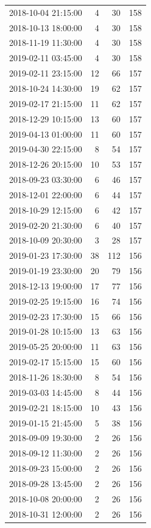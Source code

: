 \begin{tabular}{lrrr}
2018-10-04 21:15:00 & 4 & 30 & 158 \\
2018-10-13 18:00:00 & 4 & 30 & 158 \\
2018-11-19 11:30:00 & 4 & 30 & 158 \\
2019-02-11 03:45:00 & 4 & 30 & 158 \\
2019-02-11 23:15:00 & 12 & 66 & 157 \\
2018-10-24 14:30:00 & 19 & 62 & 157 \\
2019-02-17 21:15:00 & 11 & 62 & 157 \\
2018-12-29 10:15:00 & 13 & 60 & 157 \\
2019-04-13 01:00:00 & 11 & 60 & 157 \\
2019-04-30 22:15:00 & 8 & 54 & 157 \\
2018-12-26 20:15:00 & 10 & 53 & 157 \\
2018-09-23 03:30:00 & 6 & 46 & 157 \\
2018-12-01 22:00:00 & 6 & 44 & 157 \\
2018-10-29 12:15:00 & 6 & 42 & 157 \\
2019-02-20 21:30:00 & 6 & 40 & 157 \\
2018-10-09 20:30:00 & 3 & 28 & 157 \\
2019-01-23 17:30:00 & 38 & 112 & 156 \\
2019-01-19 23:30:00 & 20 & 79 & 156 \\
2018-12-13 19:00:00 & 17 & 77 & 156 \\
2019-02-25 19:15:00 & 16 & 74 & 156 \\
2019-02-23 17:30:00 & 15 & 66 & 156 \\
2019-01-28 10:15:00 & 13 & 63 & 156 \\
2019-05-25 20:00:00 & 11 & 63 & 156 \\
2019-02-17 15:15:00 & 15 & 60 & 156 \\
2018-11-26 18:30:00 & 8 & 54 & 156 \\
2019-03-03 14:45:00 & 8 & 44 & 156 \\
2019-02-21 18:15:00 & 10 & 43 & 156 \\
2019-01-15 21:45:00 & 5 & 38 & 156 \\
2018-09-09 19:30:00 & 2 & 26 & 156 \\
2018-09-12 11:30:00 & 2 & 26 & 156 \\
2018-09-23 15:00:00 & 2 & 26 & 156 \\
2018-09-28 13:45:00 & 2 & 26 & 156 \\
2018-10-08 20:00:00 & 2 & 26 & 156 \\
2018-10-31 12:00:00 & 2 & 26 & 156 \\

\end{tabular}
